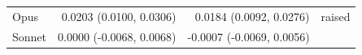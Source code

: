 \begin{tabular}{p{4.9cm}rrp{2.5cm}}
\quad Opus & 0.0203 (0.0100, 0.0306) & 0.0184 (0.0092, 0.0276) & raised \\
\quad Sonnet & 0.0000 (-0.0068, 0.0068) & -0.0007 (-0.0069, 0.0056) &  \\

\end{tabular}
